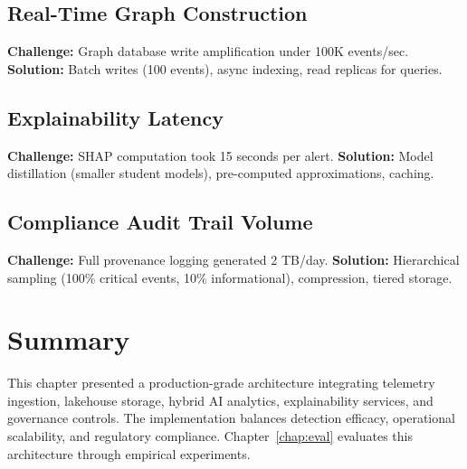 \subsection{Real-Time Graph Construction}
\textbf{Challenge:} Graph database write amplification under 100K events/sec.
\textbf{Solution:} Batch writes (100 events), async indexing, read replicas for queries.

\subsection{Explainability Latency}
\textbf{Challenge:} SHAP computation took 15 seconds per alert.
\textbf{Solution:} Model distillation (smaller student models), pre-computed approximations, caching.

\subsection{Compliance Audit Trail Volume}
\textbf{Challenge:} Full provenance logging generated 2 TB/day.
\textbf{Solution:} Hierarchical sampling (100\% critical events, 10\% informational), compression, tiered storage.

\section{Summary}
This chapter presented a production-grade architecture integrating telemetry ingestion, lakehouse storage, hybrid AI analytics, explainability services, and governance controls. The implementation balances detection efficacy, operational scalability, and regulatory compliance. Chapter~\ref{chap:eval} evaluates this architecture through empirical experiments.
